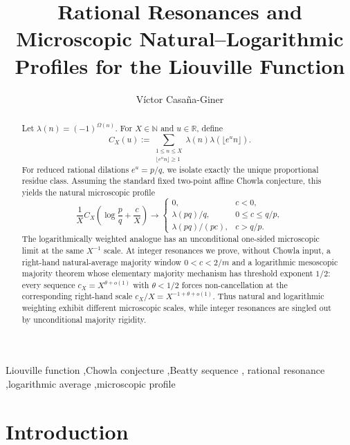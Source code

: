 \documentclass[preprint,12pt]{elsarticle}
\numberwithin{equation}{section}
\theoremstyle{plain}
\theoremstyle{definition}
\theoremstyle{remark}
\begin{document}
\begin{frontmatter}

\title{Rational Resonances and Microscopic Natural--Logarithmic Profiles for the Liouville Function}

\author[uned]{Víctor Casaña-Giner\texorpdfstring{}{}}

\begin{abstract}
Let $\lambda(n)=(-1)^{\Omega(n)}$. For $X\in\mathbb N$ and $u\in\mathbb R$, define
\[
C_X(u):=\sum_{\substack{1\le n\le X\\ \lfloor e^u n\rfloor\ge1}}
\lambda(n)\lambda(\lfloor e^u n\rfloor).
\]
For reduced rational dilations $e^u=p/q$, we isolate exactly the unique
proportional residue class. Assuming the standard fixed two-point affine
Chowla conjecture, this yields the natural microscopic profile
\[
\frac{1}{X}C_X\!\left(\log\frac pq+\frac cX\right)
\longrightarrow
\begin{cases}
0,&c<0,\\
\lambda(pq)/q,&0\le c\le q/p,\\
\lambda(pq)/(pc),&c>q/p.
\end{cases}
\]
The logarithmically weighted analogue has an unconditional one-sided
microscopic limit at the same $X^{-1}$ scale. At integer resonances we prove,
without Chowla input, a right-hand natural-average majority window
$0<c<2/m$ and a logarithmic mesoscopic majority theorem whose elementary
majority mechanism has threshold exponent $1/2$: every sequence
$c_X=X^{\theta+o(1)}$ with $\theta<1/2$ forces non-cancellation at the
corresponding right-hand scale $c_X/X=X^{-1+\theta+o(1)}$. Thus natural and logarithmic weighting exhibit different
microscopic scales, while integer resonances are singled out by unconditional
majority rigidity.
\end{abstract}

\begin{keyword}
Liouville function \sep Chowla conjecture \sep Beatty sequence \sep
rational resonance \sep logarithmic average \sep microscopic profile
\end{keyword}

\end{frontmatter}

\section{Introduction}
\label{sec:introduction}
\end{document}
